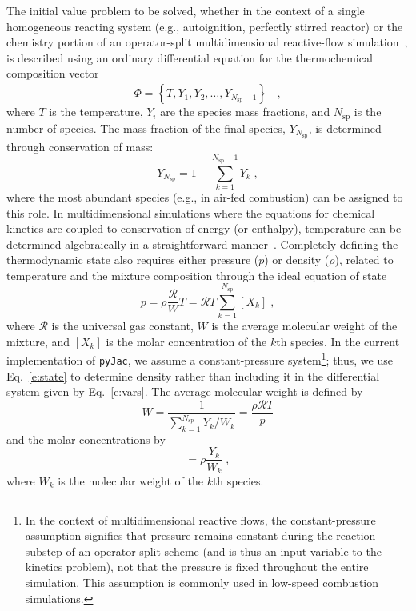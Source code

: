 \documentclass[preprint,12pt]{elsarticle}
\newcommand{ \numsp }{N_{\text{sp}}}
\begin{document}
The initial value problem to be solved, whether in the context of a single homogeneous reacting system (e.g., autoignition, perfectly stirred reactor) or the chemistry portion of an operator-split multidimensional reactive-flow simulation~\cite{Oran:2001aa}, is described using an ordinary differential equation for the thermochemical composition vector
\begin{equation}
\label{e:vars}
\Phi = \left \lbrace T, Y_1, Y_2, \dotsc, Y_{\numsp - 1} \right \rbrace^{\intercal} \;,
\end{equation}
where $T$ is the temperature, $Y_i$ are the species mass fractions, and $\numsp$ is the number of species.
The mass fraction of the final species, $Y_{\numsp}$, is determined through conservation of mass:
\begin{equation}
Y_{\numsp} = 1 - \sum_{k=1}^{\numsp - 1} Y_k \;,
\label{e:y_nsp}
\end{equation}
where the most abundant species (e.g.,  in air-fed combustion) can be assigned to this role.
In multidimensional simulations where the equations for chemical kinetics are coupled to conservation of energy (or enthalpy), temperature can be determined algebraically in a straightforward manner~\cite{Oran:2001aa}.
Completely defining the thermodynamic state also requires either pressure ($p$) or density ($\rho$), related to temperature and the mixture composition through the ideal equation of state
\begin{equation}
\label{e:state}
p = \rho \frac{\mathcal{R}}{W} T = \mathcal{R} T \sum_{k=1}^{\numsp} [X_k] \;,
\end{equation}
where $\mathcal{R}$ is the universal gas constant, $W$ is the average molecular weight of the mixture, and $[X_k]$ is the molar concentration of the $k$th species.
In the current implementation of \texttt{pyJac}, we assume a constant-pressure system\footnote{In the context of multidimensional reactive flows, the constant-pressure assumption signifies that pressure remains constant during the reaction substep of an operator-split scheme (and is thus an input variable to the kinetics problem), not that the pressure is fixed throughout the entire simulation. This assumption is commonly used in low-speed combustion simulations.}; thus, we use Eq.~\eqref{e:state} to determine density rather than including it in the differential system given by Eq.~\eqref{e:vars}.
The average molecular weight is defined by
\begin{equation}
W = \frac{1}{\sum_{k=1}^{\numsp} Y_k / W_k} = \frac{\rho \mathcal{R} T}{p}
\end{equation}
and the molar concentrations by
\begin{equation}
[X_k] = \rho \frac{Y_k}{W_k} \;,
\end{equation}
where $W_k$ is the molecular weight of the $k$th species.
\end{document}
